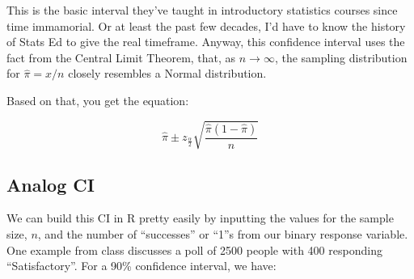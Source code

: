 \documentclass[
]{book}
\newenvironment{Shaded}{\begin{snugshade}}{\end{snugshade}}
\newcommand{\CommentTok}[1]{\textcolor[rgb]{0.56,0.35,0.01}{\textit{#1}}}
\newcommand{\DecValTok}[1]{\textcolor[rgb]{0.00,0.00,0.81}{#1}}
\newcommand{\FloatTok}[1]{\textcolor[rgb]{0.00,0.00,0.81}{#1}}
\newcommand{\KeywordTok}[1]{\textcolor[rgb]{0.13,0.29,0.53}{\textbf{#1}}}
\newcommand{\NormalTok}[1]{#1}
\newcommand{\OperatorTok}[1]{\textcolor[rgb]{0.81,0.36,0.00}{\textbf{#1}}}
\newcommand{\StringTok}[1]{\textcolor[rgb]{0.31,0.60,0.02}{#1}}
\theoremstyle{definition}
\theoremstyle{definition}
\theoremstyle{definition}
\theoremstyle{remark}
\begin{document}
This is the basic interval they've taught in introductory statistics courses since time immamorial. Or at least the past few decades, I'd have to know the history of Stats Ed to give the real timeframe. Anyway, this confidence interval uses the fact from the Central Limit Theorem, that, as \(n \rightarrow \infty\), the sampling distribution for \(\hat\pi = x/n\) closely resembles a Normal distribution.

Based on that, you get the equation:

\[\hat\pi \pm z_{\frac{\alpha}{2}} \sqrt{\frac{\hat\pi (1 - \hat\pi)}{n}}\]

\hypertarget{analog-ci}{%
\subsection{Analog CI}\label{analog-ci}}

We can build this CI in R pretty easily by inputting the values for the sample size, \(n\), and the number of ``successes'' or ``1''s from our binary response variable. One example from class discusses a poll of 2500 people with 400 responding ``Satisfactory''. For a 90\% confidence interval, we have:

\begin{Shaded}
\end{Shaded}
\end{document}

